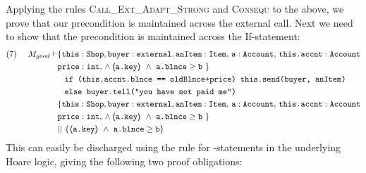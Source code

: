 \begin{proofO}
Applying the rules \textsc{Call\_Ext\_Adapt\_Strong} and \textsc{Consequ} to the above, we prove that our precondition is maintained across the external call. 
Next we need to show that the precondition is maintained across the If-statement:
\small
\begin{align*}
\text{(7)}  \ \ \ \ M_{good} \vdash & \{  \prg{this}:\prg{Shop}, \prg{buyer} : \prg{external}, \prg{anItem} : \prg{Item},\, \prg{a}:\prg{Account},\, \prg{this.accnt}:\prg{Account}\\
				& \prg{price} : \prg{int},\,
				  \wedge\, 
				  \inside{\prg{a.key}}\ \wedge\ {\prg{a.blnce} \geq \prg{b}}\ \}\\
		  		&\;\;\; \prg{if (this.accnt.blnce == oldBlnce+price) this.send(buyer, anItem)}\ \\  
				&\;\;\;  \prg{else buyer.tell("you have not paid me")}\\
		  		&  \{  \prg{this}:\prg{Shop}, \prg{buyer} : \prg{external}, \prg{anItem} : \prg{Item},\, \prg{a}:\prg{Account},\, \prg{this.accnt}:\prg{Account}\\
				& \prg{price} : \prg{int},\,
				  \wedge\, 
				  \inside{\prg{a.key}}\ \wedge\ {\prg{a.blnce} \geq \prg{b}}\ \}\\ 
				& || \  \{ \inside{\prg{a.key}}\ \wedge\ {\prg{a.blnce} \geq \prg{b}} \}
\end{align*}
\normalsize
This can easily be discharged using the rule for -statements in the underlying Hoare logic, giving the following two proof obligations:

\end{proofO}
